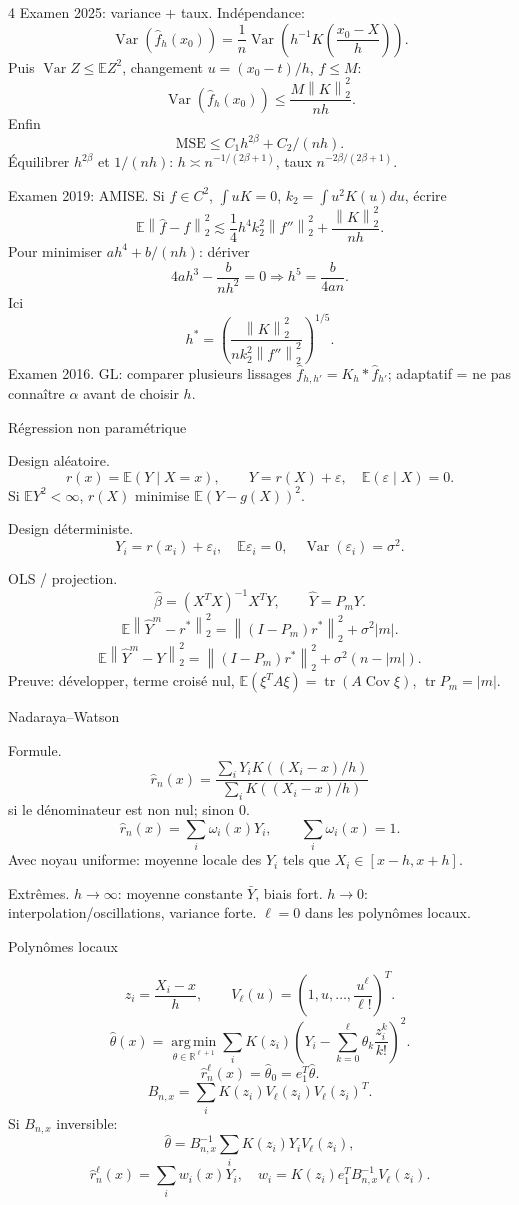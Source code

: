 \documentclass[10pt]{article}
\newcommand{\E}{\mathbb E}
\newcommand{\V}{\operatorname{Var}}
\newcommand{\Cov}{\operatorname{Cov}}
\newcommand{\R}{\mathbb R}
\newcommand{\argmin}{\operatorname*{arg\,min}}
\newcommand{\norm}[1]{\left\lVert #1\right\rVert}
\newcommand{\boxhead}[1]{%
  \vspace{2pt}\par\noindent #1\par\vspace{1pt}}
\newcommand{\tinytitle}[1]{#1.}
\begin{document}
\begin{multicols*}{4}
\tinytitle{Examen 2025: variance + taux}
Indépendance:
\[
\V(\widehat f_h(x_0))
=\frac1n\V\!\left(h^{-1}K\!\left(\frac{x_0-X}{h}\right)\right).
\]
Puis \(\V Z\le\E Z^2\), changement \(u=(x_0-t)/h\), \(f\le M\):
\[
\V(\widehat f_h(x_0))\le \frac{M\norm K_2^2}{nh}.
\]
Enfin
\[
\mathrm{MSE}\le C_1h^{2\beta}+C_2/(nh).
\]
Équilibrer \(h^{2\beta}\) et \(1/(nh)\): \(h\asymp n^{-1/(2\beta+1)}\), taux \(n^{-2\beta/(2\beta+1)}\).

\tinytitle{Examen 2019: AMISE}
Si \(f\in C^2\), \(\int uK=0\), \(k_2=\int u^2K(u)du\), écrire
\[
\E\norm{\widehat f-f}_2^2\lesssim
\frac14h^4k_2^2\norm{f''}_2^2+\frac{\norm K_2^2}{nh}.
\]
Pour minimiser \(ah^4+b/(nh)\): dériver
\[
4ah^3-\frac{b}{nh^2}=0
\Rightarrow h^5=\frac{b}{4an}.
\]
Ici
\[
h^*=\left(\frac{\norm K_2^2}{n k_2^2\norm{f''}_2^2}\right)^{1/5}.
\]
\tinytitle{Examen 2016} GL: comparer plusieurs lissages \(\widehat f_{h,h'}=K_h*\widehat f_{h'}\); adaptatif = ne pas connaître \(\alpha\) avant de choisir \(h\).

\boxhead{Régression non paramétrique}
\tinytitle{Design aléatoire}
\[
r(x)=\E(Y\mid X=x),\qquad
Y=r(X)+\varepsilon,\quad \E(\varepsilon\mid X)=0.
\]
Si \(\E Y^2<\infty\), \(r(X)\) minimise \(\E(Y-g(X))^2\).

\tinytitle{Design déterministe}
\[
Y_i=r(x_i)+\varepsilon_i,\quad
\E\varepsilon_i=0,\quad \V(\varepsilon_i)=\sigma^2.
\]

\tinytitle{OLS / projection}
\[
\widehat\beta=(X^TX)^{-1}X^TY,\qquad
\widehat Y=P_mY.
\]
\[
\E\norm{\widehat Y^m-r^*}_2^2
=\norm{(I-P_m)r^*}_2^2+\sigma^2|m|.
\]
\[
\E\norm{\widehat Y^m-Y}_2^2
=\norm{(I-P_m)r^*}_2^2+\sigma^2(n-|m|).
\]
Preuve: développer, terme croisé nul, \(\E(\xi^TA\xi)=\operatorname{tr}(A\Cov\xi)\), \(\operatorname{tr}P_m=|m|\).

\boxhead{Nadaraya--Watson}
\tinytitle{Formule}
\[
\widehat r_n(x)=
\frac{\sum_iY_iK((X_i-x)/h)}
{\sum_iK((X_i-x)/h)}
\]
si le dénominateur est non nul; sinon \(0\).
\[
\widehat r_n(x)=\sum_i\omega_i(x)Y_i,\qquad
\sum_i\omega_i(x)=1.
\]
Avec noyau uniforme: moyenne locale des \(Y_i\) tels que \(X_i\in[x-h,x+h]\).

\tinytitle{Extrêmes} \(h\to\infty\): moyenne constante \(\bar Y\), biais fort. \(h\to0\): interpolation/oscillations, variance forte. \(\ell=0\) dans les polynômes locaux.

\boxhead{Polynômes locaux}
\[
z_i=\frac{X_i-x}{h},\qquad
V_\ell(u)=\left(1,u,\ldots,\frac{u^\ell}{\ell!}\right)^T.
\]
\[
\widehat\theta(x)=\argmin_{\theta\in\R^{\ell+1}}
\sum_iK(z_i)\left(Y_i-\sum_{k=0}^{\ell}\theta_k\frac{z_i^k}{k!}\right)^2.
\]
\[
\widehat r_n^\ell(x)=\widehat\theta_0=e_1^T\widehat\theta.
\]
\[
B_{n,x}=\sum_iK(z_i)V_\ell(z_i)V_\ell(z_i)^T.
\]
Si \(B_{n,x}\) inversible:
\[
\widehat\theta=B_{n,x}^{-1}\sum_iK(z_i)Y_iV_\ell(z_i),
\]
\[
\widehat r_n^\ell(x)=\sum_iw_i(x)Y_i,\quad
w_i=K(z_i)e_1^TB_{n,x}^{-1}V_\ell(z_i).
\]


\end{multicols*}
\end{document}
